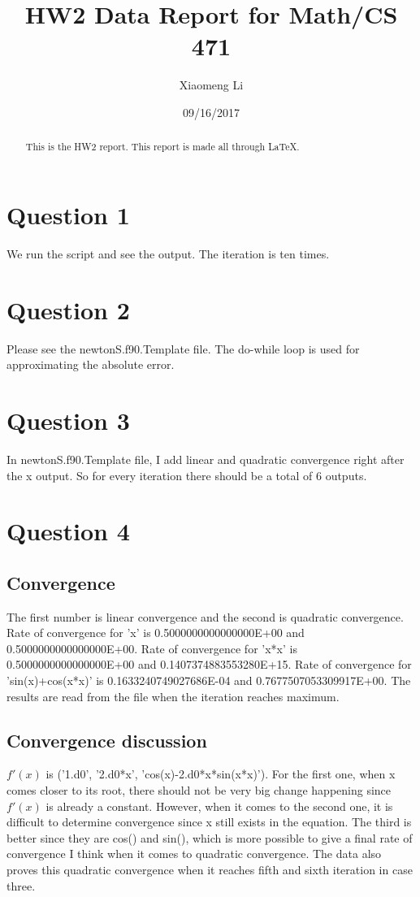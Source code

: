 \documentclass[titlepage]{article}
\title{HW2 Data Report for Math/CS 471}
\author{Xiaomeng Li}
\date{09/16/2017}   %
\begin{document}
\maketitle

\begin{abstract}
This is the HW2 report. This report is made all through LaTeX.
\end{abstract}

\section{Question 1}
We run the script and see the output. The iteration is ten times.

\section{Question 2}
Please see the newtonS.f90.Template file. The do-while loop is used
for approximating the absolute error.

\section{Question 3}
In newtonS.f90.Template file, I add linear and quadratic convergence
right after the x output. So for every iteration there should be a
total of 6 outputs.

\section{Question 4}
\subsection{Convergence}
The first number is linear convergence and the second is quadratic
convergence.  
Rate of convergence for 'x' is 0.5000000000000000E+00 and
0.5000000000000000E+00.
Rate of convergence for 'x*x' is 0.5000000000000000E+00 and 
0.1407374883553280E+15. 
Rate of convergence for 'sin(x)+cos(x*x)' is 0.1633240749027686E-04 and
0.7677507053309917E+00.
The results are read from the file when the iteration reaches maximum.

\subsection{Convergence discussion}
$f'(x)$ is ('1.d0', '2.d0*x', 'cos(x)-2.d0*x*sin(x*x)'). 
For the first one, when x comes closer to its root, there should not
be very big change happening since $f'(x)$ is already a
constant. However, when it comes to the second one, it is difficult to
determine convergence since x still exists in the equation. The third
is better since they are cos() and sin(), which is more possible to give a
final rate of convergence I think when it comes to quadratic
convergence. The data also proves this quadratic convergence when it
reaches fifth and sixth iteration in case three.
\end{document}

